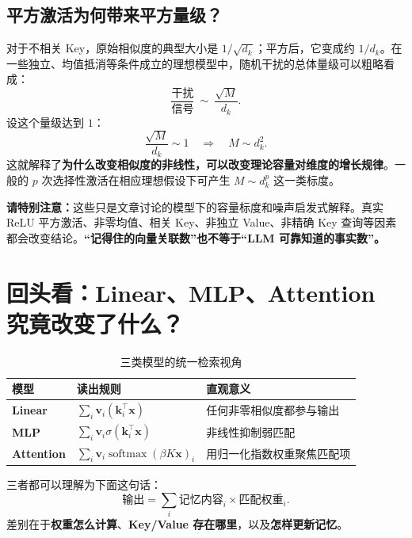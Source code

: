 \documentclass[11pt,a4paper,UTF8]{ctexart}
\numberwithin{equation}{section}
\newcommand{\vect}[1]{\boldsymbol{#1}}
\newcommand{\softmax}{\operatorname{softmax}}
\begin{document}
\subsection{平方激活为何带来平方量级？}
对于不相关 Key，原始相似度的典型大小是 $1/\sqrt{d_k}$；平方后，它变成约 $1/d_k$。在一些独立、均值抵消等条件成立的理想模型中，随机干扰的总体量级可以粗略看成：
\[
\frac{\text{干扰}}{\text{信号}}\ \sim\ \frac{\sqrt M}{d_k}.
\]
设这个量级达到 $1$：
\begin{equation}
\frac{\sqrt M}{d_k}\sim1
\quad\Rightarrow\quad
\boxed{M\sim d_k^2.}
\end{equation}
这就解释了\textbf{为什么改变相似度的非线性，可以改变理论容量对维度的增长规律}。一般的 $p$ 次选择性激活在相应理想假设下可产生 $M\sim d_k^p$ 这一类标度。

\begin{warningbox}
\textbf{请特别注意：}这些只是文章讨论的模型下的容量标度和噪声启发式解释。真实 ReLU 平方激活、非零均值、相关 Key、非独立 Value、非精确 Key 查询等因素都会改变结论。\textbf{“记得住的向量关联数”也不等于“LLM 可靠知道的事实数”。}
\end{warningbox}

\section{回头看：Linear、MLP、Attention 究竟改变了什么？}

\begin{table}[H]
\centering
\renewcommand{\arraystretch}{1.45}
\caption{三类模型的统一检索视角}
\begin{tabularx}{\linewidth}{@{}>{\bfseries}p{21mm}X X@{}}
\toprule
模型 & 读出规则 & 直观意义 \\
\midrule
Linear & $\sum_i \vect{v}_i (\vect{k}_i^\top\vect{x})$ & 任何非零相似度都参与输出 \\
MLP & $\sum_i \vect{v}_i\sigma(\vect{k}_i^\top\vect{x})$ & 非线性抑制弱匹配 \\
Attention & $\sum_i \vect{v}_i\softmax(\beta K\vect{x})_i$ & 用归一化指数权重聚焦匹配项 \\
\bottomrule
\end{tabularx}
\end{table}

三者都可以理解为下面这句话：
\begin{equation}
\boxed{\text{输出}=\sum_i\text{记忆内容}_i\times\text{匹配权重}_i.}
\end{equation}
差别在于\textbf{权重怎么计算}、\textbf{Key/Value 存在哪里}，以及\textbf{怎样更新记忆}。
\end{document}
